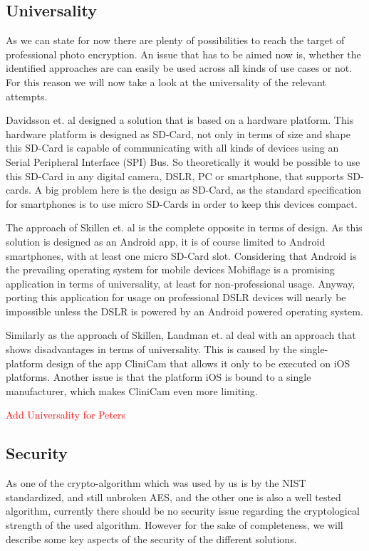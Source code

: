 \documentclass[12pt,a4paper,titlepage,oneside]{scrartcl}
\newcommand\todo[1]{\textcolor{red}{#1}}
\begin{document}
\subsection{Universality}
As we can state for now there are plenty of possibilities to reach the target of professional photo encryption.
An issue that has to be aimed now is, whether the identified approaches are can easily be used across all kinds of use cases or not.
For this reason we will now take a look at the universality of the relevant attempts.

Davidsson et. al \cite{Davidsson2016} designed a solution that is based on a hardware platform.
This hardware platform is designed as SD-Card, not only in terms of size and shape this SD-Card is capable of communicating with all kinds of devices using an Serial Peripheral Interface (SPI) Bus.
So theoretically it would be possible to use this SD-Card in any digital camera, DSLR, PC or smartphone, that supports SD-cards.
A big problem here is the design as SD-Card, as the standard specification for smartphones is to use micro SD-Cards in order to keep this devices compact.

The approach of Skillen et. al \cite{skillen2013implementing} is the complete opposite in terms of design.
As this solution is designed as an Android app, it is of course limited to Android smartphones, with at least one micro SD-Card slot.
Considering that Android is the prevailing operating system for mobile devices Mobiflage is a promising application in terms of universality, at least for non-professional usage.
Anyway, porting this application for usage on professional DSLR devices will nearly be impossible unless the DSLR is powered by an Android powered operating system.

Similarly as the approach of Skillen, Landman et. al \cite{pmid25565678} deal with an approach that shows disadvantages in terms of universality.
This is caused by the single-platform design of the app CliniCam that allows it only to be executed on iOS platforms.
Another issue is that the platform iOS is bound to a single manufacturer, which makes CliniCam even more limiting.

\todo{Add Universality for Peters}

\subsection{Security}
As one of the crypto-algorithm which was used by us is by the NIST standardized, and still unbroken AES, and the other one is also a well tested algorithm, currently there should be no security issue regarding the cryptological strength of the used algorithm.
However for the sake of completeness, we will describe some key aspects of the security of the different solutions.
\end{document}
